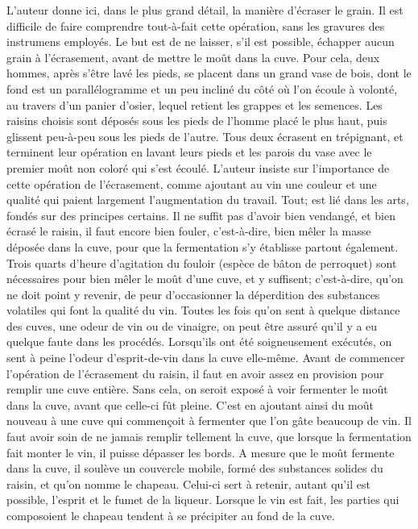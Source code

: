 L'auteur donne ici, dans le plus grand détail, la manière d'écraser le grain. Il est difficile de faire comprendre tout-à-fait cette opération, sans les gravures des instrumens employés. Le but est de ne laisser, s'il est possible, échapper aucun grain à l'écrasement, avant de mettre le moût dans la cuve. Pour cela, deux hommes, après s'être lavé les pieds, se placent dans un grand vase de bois, dont le fond est un parallélogramme et un peu incliné du côté où l'on écoule à volonté, au travers d'un panier d'osier, lequel retient les grappes et les semences. Les raisins choisis sont déposés sous les pieds de l'homme placé le plus haut, puis glissent peu-à-peu sous les pieds de l'autre. Tous deux écrasent en trépignant, et terminent leur opération en lavant leurs pieds et les parois du vase avec le premier moût non coloré qui s'est écoulé. L'auteur insiste sur l'importance de cette opération de l'écrasement, comme ajoutant au vin une couleur et une qualité qui paient largement l'augmentation du travail.\setcounter{page}{91} Tout; est lié dans les arts, fondés sur des principes certains. Il ne suffit pas d'avoir bien vendangé, et bien écrasé le raisin, il faut encore bien fouler, c'est-à-dire, bien mêler la masse déposée dans la cuve, pour que la fermentation s'y établisse partout également. Trois quarts d'heure d'agitation du fouloir (espèce de bâton de perroquet) sont nécessaires pour bien mêler le moût d'une cuve, et y suffisent; c'est-à-dire, qu'on ne doit point y revenir, de peur d'occasionner la déperdition des substances volatiles qui font la qualité du vin.
Toutes les fois qu'on sent à quelque distance des cuves, une odeur de vin ou de vinaigre, on peut être assuré qu'il y a eu quelque faute dans les procédés. Lorsqu'ils ont été soigneusement exécutés, on sent à peine l'odeur d'esprit-de-vin dans la cuve elle-même.
Avant de commencer l'opération de l'écrasement du raisin, il faut en avoir assez en provision pour remplir une cuve entière. Sans cela, on seroit exposé à voir fermenter le moût dans la cuve, avant que celle-ci fût pleine. C'est en ajoutant ainsi du moût nouveau à une cuve qui commençoit à fermenter que l'on gâte beaucoup de vin. Il faut avoir\setcounter{page}{92} soin de ne jamais remplir tellement la cuve, que lorsque la fermentation fait monter le vin, il puisse dépasser les bords. A mesure que le moût fermente dans la cuve, il soulève un couvercle mobile, formé des substances solides du raisin, et qu'on nomme le chapeau. Celui-ci sert à retenir, autant qu'il est possible, l'esprit et le fumet de la liqueur. Lorsque le vin est fait, les parties qui composoient le chapeau tendent à se précipiter au fond de la cuve.
